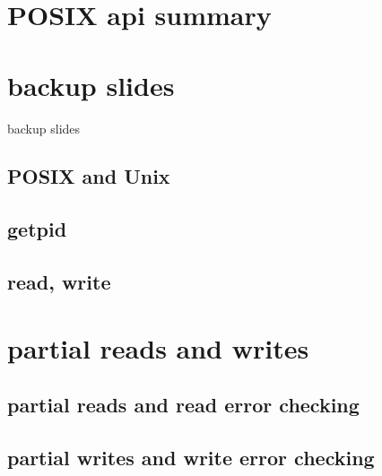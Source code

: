 




\section{POSIX api summary}


\section{backup slides}
\begin{frame}{}
\end{frame}

\begin{frame}{backup slides}
\end{frame}

\subsection{POSIX and Unix}



\subsection{getpid}




\subsection{read, write}




\section{partial reads and writes}
\subsection{partial reads and read error checking}

\subsection{partial writes and write error checking}



